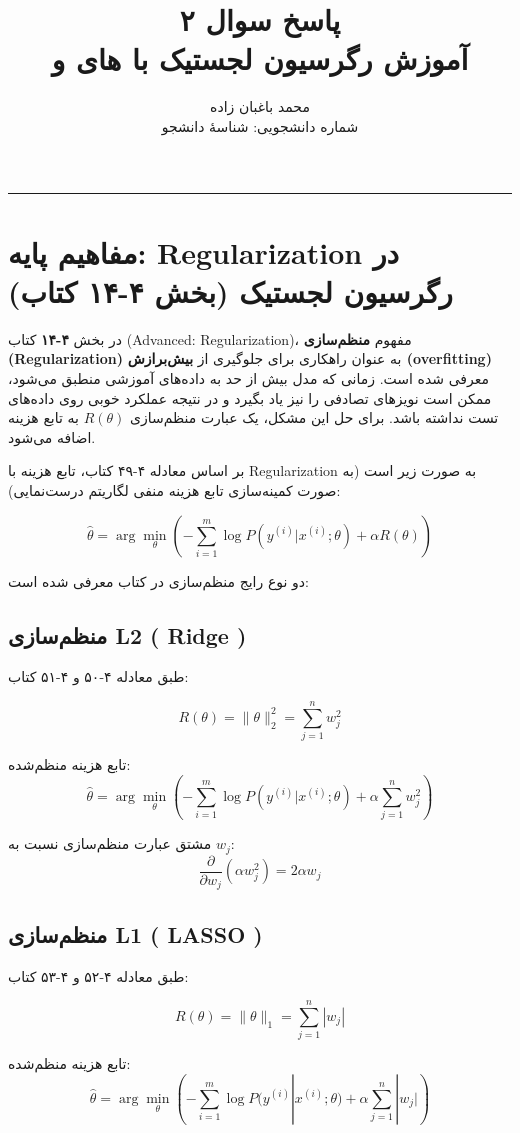 \documentclass[11pt,a4paper]{article}
\title{\textbf{پاسخ سوال ۲} \\[0.4cm] \small آموزش رگرسیون لجستیک با \en{Regularization} های \en{L1} و \en{L2}}
\author{محمد باغبان زاده \\ شماره دانشجویی: شناسهٔ دانشجو}
\date{}
\newcommand{\en}[1]{\textenglish{#1}}
\newcommand{\thickseparator}{\vspace{1em}\noindent\rule{\linewidth}{1pt}\vspace{1em}}
\begin{document}
\maketitle
\thickseparator

\section{مفاهیم پایه: \en{Regularization} در رگرسیون لجستیک (بخش \en{۴-۱۴} کتاب)}

در بخش \textbf{\en{۴-۱۴}} کتاب (\en{Advanced: Regularization})، مفهوم \textbf{منظم‌سازی (\en{Regularization})} به عنوان راهکاری برای جلوگیری از \textbf{بیش‌برازش (\en{overfitting})} معرفی شده است. زمانی که مدل بیش از حد به داده‌های آموزشی منطبق می‌شود، ممکن است نویزهای تصادفی را نیز یاد بگیرد و در نتیجه عملکرد خوبی روی داده‌های تست نداشته باشد. برای حل این مشکل، یک عبارت منظم‌سازی \(R(\theta)\) به تابع هزینه اضافه می‌شود.

بر اساس معادله \en{۴-۴۹} کتاب، تابع هزینه با \en{Regularization} به صورت زیر است (به صورت کمینه‌سازی تابع هزینه منفی لگاریتم درست‌نمایی):

\[
\hat{\theta} = \arg\min_{\theta} \left( -\sum_{i=1}^{m} \log P(y^{(i)}|x^{(i)};\theta) + \alpha R(\theta) \right)
\]

دو نوع رایج منظم‌سازی در کتاب معرفی شده است:

\subsection{منظم‌سازی \en{L2} ( \en{Ridge} )}
طبق معادله \en{۴-۵۰} و \en{۴-۵۱} کتاب:

\[
R(\theta) = \|\theta\|_2^2 = \sum_{j=1}^{n} w_j^2
\]

تابع هزینه منظم‌شده:
\[
\hat{\theta} = \arg\min_{\theta} \left( -\sum_{i=1}^{m} \log P(y^{(i)}|x^{(i)};\theta) + \alpha \sum_{j=1}^{n} w_j^2 \right)
\]

مشتق عبارت منظم‌سازی نسبت به \(w_j\):
\[
\frac{\partial}{\partial w_j} (\alpha w_j^2) = 2\alpha w_j
\]

\newpage
\subsection{منظم‌سازی \en{L1} ( \en{LASSO} )}
طبق معادله \en{۴-۵۲} و \en{۴-۵۳} کتاب:

\[
R(\theta) = \|\theta\|_1 = \sum_{j=1}^{n} |w_j|
\]

تابع هزینه منظم‌شده:
\[
\hat{\theta} = \arg\min_{\theta} \left( -\sum_{i=1}^{m} \log P(y^{(i)}|x^{(i)};\theta) + \alpha \sum_{j=1}^{n} |w_j| \right)
\]
\end{document}
